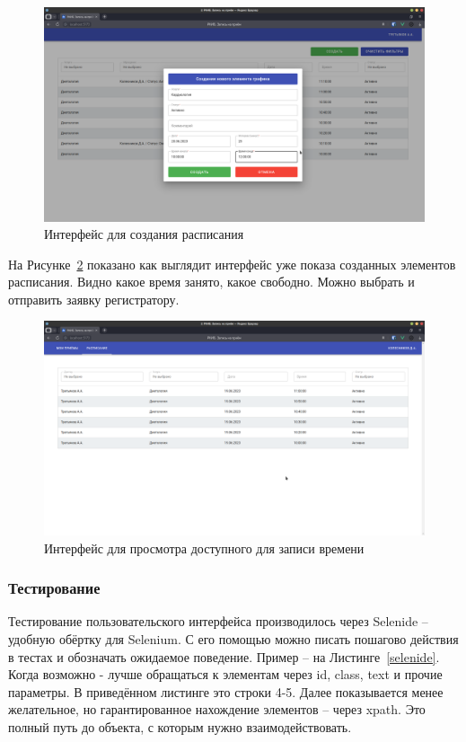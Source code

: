 \documentclass[a4paper,article]{article}
\begin{document}
\begin{sloppypar}
    \begin{figure}[h]
        \centering
        \includegraphics[width=0.8\linewidth]{UI. Пример создания расписания.png}        
        \caption{\centering Интерфейс для создания расписания}        
        \label{fig:createsched}        
    \end{figure}
    
    \newpage
    
    На Рисунке~\ref{fig:dosched} показано как выглядит интерфейс уже показа созданных элементов расписания. Видно какое время занято, какое свободно. Можно выбрать и отправить заявку регистратору.
    
    \begin{figure}[h]
        \centering
        \includegraphics[width=0.8\linewidth]{UI. Доступное для записи время.png}        
        \caption{\centering Интерфейс для просмотра доступного для записи времени}        
        \label{fig:dosched}
    \end{figure}

    \subsubsection{Тестирование}\label{Реализация. Клиентская часть. Тестирование}
    
    Тестирование пользовательского интерфейса производилось через Selenide -- удобную обёртку для Selenium. С его помощью можно писать пошагово действия в тестах и обозначать ожидаемое поведение. Пример -- на Листинге~\ref{selenide}. Когда возможно - лучше обращаться к элементам через id, class, text и прочие параметры. В приведённом листинге это строки 4-5. Далее показывается менее желательное, но гарантированное нахождение элементов -- через xpath. Это полный путь до объекта, с которым нужно взаимодействовать.
    

\end{sloppypar}
\end{document}
